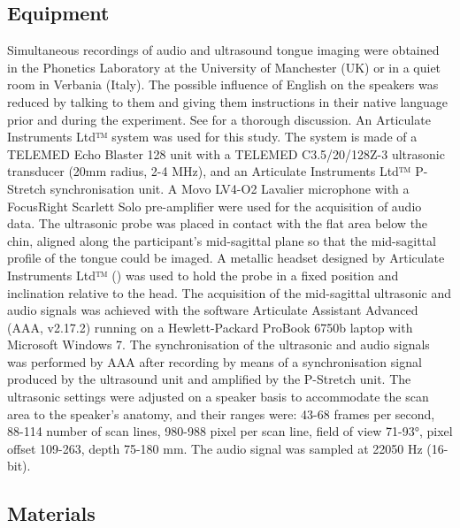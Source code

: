 \documentclass[preprint]{JASAnew}
\begin{document}
\hypertarget{equipment}{%
\subsection{Equipment}\label{equipment}}

\label{s:equipment}

Simultaneous recordings of audio and ultrasound tongue imaging were
obtained in the Phonetics Laboratory at the University of Manchester
(UK) or in a quiet room in Verbania (Italy). The possible influence of
English on the speakers was reduced by talking to them and giving them
instructions in their native language prior and during the experiment.
See \citet{coretta2019k} for a thorough discussion. An Articulate
Instruments Ltd™ system was used for this study. The system is made of a
TELEMED Echo Blaster 128 unit with a TELEMED C3.5/20/128Z-3 ultrasonic
transducer (20mm radius, 2-4 MHz), and an Articulate Instruments Ltd™
P-Stretch synchronisation unit. A Movo LV4-O2 Lavalier microphone with a
FocusRight Scarlett Solo pre-amplifier were used for the acquisition of
audio data. The ultrasonic probe was placed in contact with the flat
area below the chin, aligned along the participant's mid-sagittal plane
so that the mid-sagittal profile of the tongue could be imaged. A
metallic headset designed by Articulate Instruments Ltd™
(\citeyear{articulate2008}) was used to hold the probe in a fixed
position and inclination relative to the head. The acquisition of the
mid-sagittal ultrasonic and audio signals was achieved with the software
Articulate Assistant Advanced (AAA, v2.17.2) running on a
Hewlett-Packard ProBook 6750b laptop with Microsoft Windows 7. The
synchronisation of the ultrasonic and audio signals was performed by AAA
after recording by means of a synchronisation signal produced by the
ultrasound unit and amplified by the P-Stretch unit. The ultrasonic
settings were adjusted on a speaker basis to accommodate the scan area
to the speaker's anatomy, and their ranges were: 43-68 frames per
second, 88-114 number of scan lines, 980-988 pixel per scan line, field
of view 71-93°, pixel offset 109-263, depth 75-180 mm. The audio signal
was sampled at 22050 Hz (16-bit).

\hypertarget{materials}{%
\subsection{Materials}\label{materials}}

\end{document}
